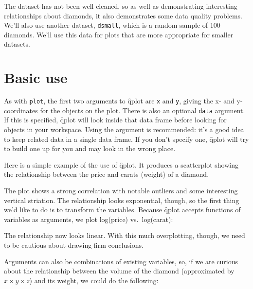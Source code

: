 The dataset has not been well cleaned, so as well as demonstrating interesting relationships about diamonds, it also demonstrates some data quality problems. We'll also use another dataset, {\tt dsmall}, which is a random sample of 100 diamonds. We'll use this data for plots that are more appropriate for smaller datasets. 

% 


\section{Basic use}
\label{sec:basic_use}

As with  {\tt plot}, the first two arguments to \f{qplot} are {\tt x} and {\tt y}, giving the x- and y-coordinates for the objects on the plot. There is also an optional {\tt data} argument.  If this is specified, \f{qplot} will look inside that data frame before looking for objects in your workspace.  Using the  argument is recommended: it's a good idea to keep related data in a single data frame.  If you don't specify one, \f{qplot} will try to build one up for you and may look in the wrong place.  

Here is a simple example of the use of \f{qplot}.  It produces a scatterplot showing the relationship between the price and carats (weight) of a diamond.  

% 


The plot shows a strong correlation with notable outliers and some interesting vertical striation.  The relationship looks exponential, though, so the first thing we'd like to do is to transform the variables.  Because \f{qplot} accepts functions of variables as arguments, we plot log(price) vs.\ log(carat):

% 


\noindent The relationship now looks linear.  With this much overplotting, though, we need to be cautious about drawing firm conclusions.

Arguments can also be combinations of existing variables, so, if we are curious about the relationship between the volume of the diamond (approximated by $x \times y \times z$) and its weight, we could do the following:


